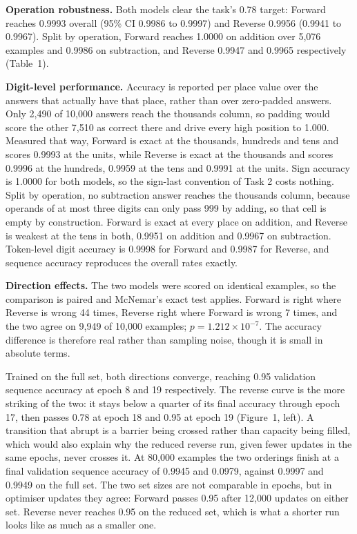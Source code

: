 \documentclass[10pt,a4paper,twocolumn]{article}
\begin{document}
\textbf{Operation robustness.} Both models clear the task's 0.78 target: Forward reaches
0.9993 overall (95\% CI 0.9986 to 0.9997) and Reverse
0.9956 (0.9941 to 0.9967). Split by operation,
Forward reaches 1.0000 on addition over 5,076 examples and
0.9986 on subtraction, and Reverse 0.9947 and
0.9965 respectively (Table~1).

\textbf{Digit-level performance.} Accuracy is reported per place value over the answers that
actually have that place, rather than over zero-padded answers. Only
2,490 of 10,000 answers reach the thousands column, so padding would score the
other 7,510 as correct there and drive every high position
to 1.000.
Measured that way, Forward is exact at the thousands, hundreds and tens and scores 0.9993 at the units, while Reverse is exact at the thousands and scores 0.9996 at the hundreds, 0.9959 at the tens and 0.9991 at the units. Sign accuracy is 1.0000 for both models, so the sign-last convention of Task 2 costs nothing. Split by operation, no subtraction answer reaches the thousands column, because operands of at most three digits can only pass 999 by adding, so that cell is empty by construction. Forward is exact at every place on addition, and Reverse is weakest at the tens in both, 0.9951 on addition and 0.9967 on subtraction. Token-level digit
accuracy is 0.9998 for Forward and 0.9987 for
Reverse, and sequence accuracy reproduces the overall rates exactly.

\textbf{Direction effects.} The two models were scored on identical examples, so the comparison is
paired and McNemar's exact test applies. Forward is right where Reverse is wrong 44
times, Reverse right where Forward is wrong 7 times, and the two agree on
9,949 of 10,000 examples; $p = 1.212 \times 10^{-7}$. The accuracy difference is therefore real rather than sampling noise, though it is small in absolute terms.

Trained on the full set, both directions converge, reaching 0.95 validation sequence accuracy at epoch
8 and 19 respectively. The reverse curve is the more striking of the two: it stays below a quarter of its final accuracy through epoch 17, then passes 0.78 at epoch 18 and 0.95 at epoch 19 (Figure~1, left). A transition that abrupt is a barrier being crossed rather than capacity being filled, which would also explain why the reduced reverse run, given fewer updates in the same epochs, never crosses it. At 80,000 examples the two orderings finish at a final validation sequence accuracy of 0.9945 and 0.0979, against 0.9997 and 0.9949 on the full set. The two set sizes are not comparable in epochs, but in optimiser updates they agree: Forward passes 0.95 after 12,000 updates on either set. Reverse never reaches 0.95 on the reduced set, which is what a shorter run looks like as much as a smaller one.
\end{document}
